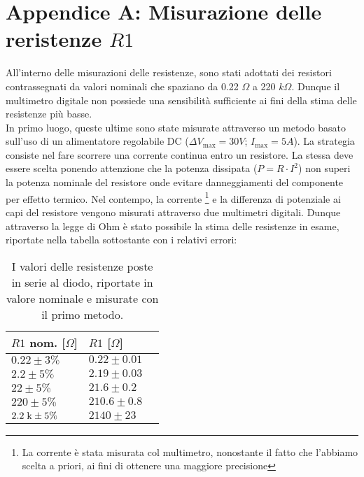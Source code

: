 \documentclass{article}[a4paper, oneside, 11pt]
\begin{document}
\section{Appendice A: Misurazione delle reristenze $R1$}\label{app: A}

All’interno delle misurazioni delle resistenze, sono stati adottati dei resistori
contrassegnati da valori nominali che spaziano da 0.22 $\Omega$ a 220 $k\Omega$.
Dunque il multimetro digitale non possiede una sensibilità sufficiente ai fini
della stima delle resistenze più basse.\\  
In primo luogo, queste ultime sono state misurate attraverso un metodo basato
sull’uso di un alimentatore regolabile DC ($\Delta V_{\text{max}} = 30 V$;
$I_{\text{max}} = 5 A$). La strategia consiste nel fare scorrere una corrente
continua entro un resistore. La stessa deve essere scelta ponendo attenzione
che la potenza dissipata ($P =R \cdot I^{2}$) non superi la potenza nominale
del resistore onde evitare danneggiamenti del componente per effetto termico.
Nel contempo, la corrente \footnote{La corrente è stata misurata col multimetro,
nonostante il fatto che l’abbiamo scelta a priori, ai fini di ottenere una maggiore precisione}
e la differenza di potenziale ai capi del resistore vengono misurati attraverso
due multimetri digitali. Dunque attraverso la legge di Ohm è stato possibile la
stima delle resistenze in esame, riportate nella tabella sottostante con i relativi errori:

\begin{table}[H]
\begin{center}
    \begin{tabular}{lll}
     \toprule
     $R1$ nom. [$\Omega$] & $R1$ [$\Omega$] \\
     \midrule
     \midrule
     $0.22 \pm 3 \% $     & $0.22 \pm 0.01 $ \\
     $2.2 \pm 5 \% $     & $2.19 \pm 0.03 $ \\
     $22 \pm 5 \% $     & $21.6 \pm 0.2 $ \\
        $220 \pm 5 \% $     & $210.6 \pm 0.8 $ \\
     $2.2\; \rm k \pm 5 \% $ & $2140 \pm 23$ \\
     \bottomrule
    \end{tabular}
    \caption{I valori delle resistenze poste in serie al diodo, riportate in
        valore nominale e misurate con il primo metodo. \label{tab:res}}
\end{center}
\end{table}
\end{document}

